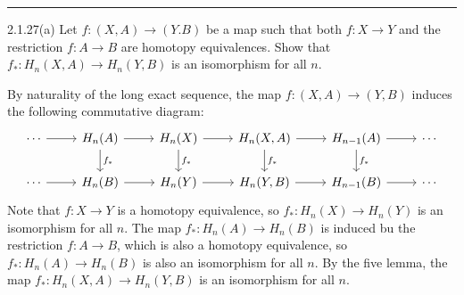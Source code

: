 \documentclass[a4paper, 12pt]{article}
\begin{document}
\noindent\rule{7in}{2.8pt}
\begin{problem}{2.1.27(a)}
Let \(f:(X,A)\rightarrow (Y.B)\) be a map such that both \(f:X\rightarrow Y\) and the restriction \(f:A\rightarrow B\) are homotopy equivalences. Show that \(f_*:H_n(X,A)\rightarrow H_n(Y,B)\) is 
an isomorphism for all \(n\).
\end{problem}
\begin{solution}
By naturality of the long exact sequence, the map \(f:(X,A)\rightarrow (Y,B)\) induces the following commutative diagram:
\[\begin{tikzcd}
	\cdots & {H_n(A)} & {H_n(X)} & {H_n(X,A)} & {H_{n-1}(A)} & \cdots \\
	\cdots & {H_n(B)} & {H_n(Y)} & {H_n(Y,B)} & {H_{n-1}(B)} & \cdots
	\arrow[from=1-1, to=1-2]
	\arrow[from=1-2, to=1-3]
	\arrow["{f_*}", from=1-2, to=2-2]
	\arrow[from=1-3, to=1-4]
	\arrow["{f_*}", from=1-3, to=2-3]
	\arrow[from=1-4, to=1-5]
	\arrow["{f_*}", from=1-4, to=2-4]
	\arrow[from=1-5, to=1-6]
	\arrow["{f_*}", from=1-5, to=2-5]
	\arrow[from=2-1, to=2-2]
	\arrow[from=2-2, to=2-3]
	\arrow[from=2-3, to=2-4]
	\arrow[from=2-4, to=2-5]
	\arrow[from=2-5, to=2-6]
\end{tikzcd}\]
Note that \(f:X\rightarrow Y\) is a homotopy equivalence, so \(f_*:H_n(X)\rightarrow H_n(Y)\) is an isomorphism for all \(n\). The map \(f_*:H_n(A)\rightarrow H_n(B)\)	is induced bu the restriction \(f:A\rightarrow B\), which 
is also a homotopy equivalence, so \(f_*:H_n(A)\rightarrow H_n(B)\) is also an isomorphism for all \(n\). By the five lemma, the map \(f_*:H_n(X,A)\rightarrow H_n(Y,B)\) is an isomorphism for all \(n\).
\end{solution}
\end{document}
